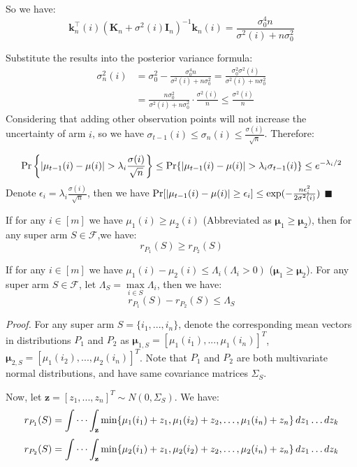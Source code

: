 \documentclass[opre,sglanonrev]{informs4}
\begin{document}
So we have:
\[
\mathbf{k}_n^\top(i)(\mathbf{K}_n + \sigma^2(i)\mathbf{I}_n)^{-1}\mathbf{k}_n(i) = \frac{\sigma_0^4n}{\sigma^2(i) + n\sigma_0^2}
\]

Substitute the results into the posterior variance formula:
\begin{equation*}
\begin{aligned}
\sigma_n^2(i) &= \sigma_0^2 - \frac{\sigma_0^4n}{\sigma^2(i) + n\sigma_0^2} = \frac{\sigma_0^2\sigma^2(i)}{\sigma^2(i) + n\sigma_0^2} \\
&= \frac{n\sigma_0^2}{\sigma^2(i)+n\sigma_0^2}\cdot \frac{\sigma^2(i)}{n} \leq \frac{\sigma^2(i)}{n}
\end{aligned}
\end{equation*} 
Considering that adding other observation points will not increase the uncertainty of arm $i$, so we have $\sigma_{t-1}(i) \leq \sigma_n(i) \leq \frac{\sigma(i)}{\sqrt{n}}$. Therefore:

$$\textnormal{Pr}\left\{|\mu_{t-1}(i)-\mu(i)|>\lambda_i \frac{\sigma(i)}{\sqrt{n}}\right\}\leq\textnormal{Pr}\{|\mu_{t-1}(i)-\mu(i)|>\lambda_i \sigma_{t-1}(i)\}\leq e^{-\lambda_i/2}$$
Denote $\epsilon_i = \lambda_i \frac{\sigma(i)}{\sqrt{n}}$, then we have $\textnormal{Pr}[|\mu_{t-1}(i)-\mu(i)|\geq \epsilon_i]\leq \exp(-\frac{n\epsilon_i^2}{2\sigma^2(i)})$  \hfill $\blacksquare$

\begin{lemma}
If for any $i \in [m]$ we have $\mu_1(i) \geq \mu_2(i)$ (Abbreviated as $\boldsymbol{\mu}_1 \geq \boldsymbol{\mu}_2)$, then for any super arm $S \in \mathcal{F}$,we have:
$$
r_{P_1}(S) \geq r_{P_2}(S)
$$	
\end{lemma}

\begin{lemma}
If for any $i \in [m]$ we have $\mu_1(i) - \mu_2(i) \leq \Lambda_i (\Lambda_i>0)$ ($\boldsymbol{\mu}_1 \geq \boldsymbol{\mu}_2$). For any super arm $S \in \mathcal{F}$, let $\Lambda_S = \mathop{\max}\limits_{i\in S}\Lambda_i$, then we have:
$$
r_{P_1}(S) - r_{P_2}(S) \leq \Lambda_S
$$
\end{lemma}
\textit{Proof.} For any super arm $S = \{i_1,...,i_n\}$, denote the corresponding mean vectors in distributions $P_1$ and $P_2$ as $\boldsymbol{\mu}_{1,S} = [\mu_1(i_1),...,\mu_1(i_n)]^T$, $\boldsymbol{\mu}_{2,S} = [\mu_1(i_2),...,\mu_2(i_n)]^T$. Note that $P_1$ and $P_2$ are both multivariate normal distributions, and have same covariance matrices $\Sigma_S$.

Now, let $\mathbf{z} = [z_1,...,z_n]^T \sim N(0,\Sigma_S)$. We have:
$$
r_{P_1}(S) = \idotsint_\mathbf{z} \min \{\mu_1(i_1)+z_1,\mu_1(i_2)+z_2, \dots ,\mu_1(i_n)+z_n\} \,dz_1 \dots dz_k
$$
$$
r_{P_2}(S) = \idotsint_\mathbf{z} \min \{\mu_2(i_1)+z_1,\mu_2(i_2)+z_2, \dots ,\mu_2(i_n)+z_n\} \,dz_1 \dots dz_k
$$
\end{document}
